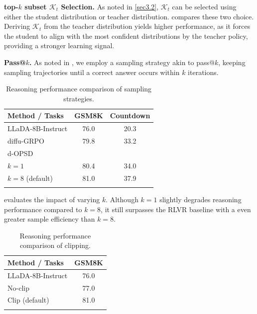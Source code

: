 \documentclass{llmxive}
\begin{document}
\textbf{top-$k$ subset $\mathcal{K}_t$ Selection. } \label{sec4.4.3} As noted in \cref{sec3.2}, $\mathcal{K}_t$ can be selected using either the student distribution or teacher distribution.  compares these two choice. Deriving $\mathcal{K}_t$ from the teacher distribution yields higher performance, as it forces the student to align with the most confident distributions by the teacher policy, providing a stronger learning signal.

\textbf{Pass@$k$. } \label{sec4.4.4} As noted in , we employ a sampling strategy akin to pass@$k$, keeping sampling trajectories until a correct answer occurs within $k$ iterations. 

\begin{table}[t]
\vspace{-20pt}
\setlength{\tabcolsep}{4pt}
\centering
\begin{tabular}{lcc}
\toprule
\textbf{Method / Tasks} & \textbf{GSM8K} & \textbf{Countdown} \\
\midrule
LLaDA-8B-Instruct & 76.0 & 20.3 \\
diffu-GRPO & 79.8 & 33.2 \\
d-OPSD \\
\quad $k=1$ & 80.4 & 34.0 \\
\quad $k=8$ (default) & \cellcolor{lightblue} 81.0 & \cellcolor{lightblue} 37.9 \\
\bottomrule
\label{tab8}
\end{tabular}
\vspace{-25pt}

\caption{Reasoning performance comparison of sampling strategies.}
\end{table}

 evaluates the impact of varying $k$. Although $k=1$ slightly degrades reasoning performance compared to $k=8$, it still surpasses the RLVR baseline with a even greater sample efficiency than $k=8$.

\begin{table}[t]
\vspace{-20pt}
\setlength{\tabcolsep}{4pt}
\centering
\begin{tabular}{lc}
\toprule
\textbf{Method / Tasks} & \textbf{GSM8K} \\
\midrule
LLaDA-8B-Instruct & 76.0 \\
No-clip & 77.0 \\
Clip (default) & \cellcolor{lightblue} 81.0 \\
\bottomrule
\label{app_tab3}
\end{tabular}
\vspace{-20pt}

\caption{Reasoning performance comparison of clipping.}
\end{table}
\end{document}
